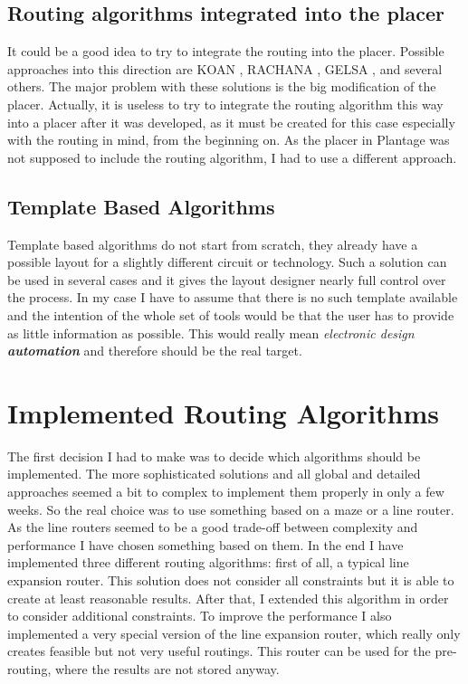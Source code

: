 \subsection{Routing algorithms integrated into the placer}
It could be a good idea to try to integrate the routing into the placer. Possible approaches into this direction are KOAN \cite[page 178]{springer:eda_analog_routing}, RACHANA \cite[page 178]{springer:eda_analog_routing}, GELSA \cite[page 179]{springer:eda_analog_routing}, and several others. The major problem with these solutions is the big modification of the placer. Actually, it is useless to try to integrate the routing algorithm this way into a placer after it was developed, as it must be created for this case especially with the routing in mind, from the beginning on. As the placer in Plantage was not supposed to include the routing algorithm, I had to use a different approach.

\subsection{Template Based Algorithms}
Template based algorithms do not start from scratch, they already have a possible layout for a slightly different circuit or technology. Such a solution can be used in several cases and it gives the layout designer nearly full control over the process. In my case I have to assume that there is no such template available and the intention of the whole set of tools would be that the user has to provide as little information as possible. This would really mean \textit{electronic design \textbf{automation}} and therefore should be the real target.

\section{Implemented Routing Algorithms}
\label{sec:implemented_algorithms}
The first decision I had to make was to decide which algorithms should be implemented. The more sophisticated solutions and all global and detailed approaches seemed a bit to complex to implement them properly in only a few weeks. So the real choice was to use something based on a maze or a line router. As the line routers seemed to be a good trade-off between complexity and performance I have chosen something based on them. In the end I have implemented three different routing algorithms: first of all, a typical line expansion router. This solution does not consider all constraints but it is able to create at least reasonable results. After that, I extended this algorithm in order to consider additional constraints. To improve the performance I also implemented a very special version of the line expansion router, which really only creates feasible but not very useful routings. This router can be used for the pre-routing, where the results are not stored anyway.

